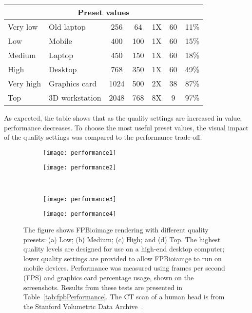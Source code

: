 \begin{table}
\begin{tabular}{|l l|c c c|c c|}
\multicolumn{7}{|c|}{\textbf{Preset values}} \\ \hline
Very low & Old laptop & 256 & 64 & 1X & 60 & 11\% \\
Low & Mobile & 400 & 100 & 1X & 60 & 15\% \\
Medium & Laptop & 450 & 150 & 1X & 60 & 18\% \\
High & Desktop & 768 & 350 & 1X & 60 & 49\% \\
Very high & Graphics card & 1024 & 500 & 2X & 38 & 87\% \\
Top & 3D workstation & 2048 & 768 & 8X & 9 & 97\% \\
\hline

\end{tabular}
\end{table}

As expected, the table shows that as the quality settings are increased in value, performance decreases. 
To choose the most useful preset values, the visual impact of the quality settings was compared to the performance trade-off. 

\begin{figure}[htbp!]
\centering
\begin{subfigure}[b]{0.49\textwidth}
\texttt{[image: performance1]}
\caption{} \label{fig:performance1}
\end{subfigure}
\hfill
\begin{subfigure}[b]{0.49\textwidth}
\texttt{[image: performance2]}
\caption{} \label{fig:performance2}
\end{subfigure}

~\newline
\begin{subfigure}[b]{0.49\textwidth}
\texttt{[image: performance3]}
\caption{} \label{fig:performance3}
\end{subfigure}
\hfill
\begin{subfigure}[b]{0.49\textwidth}
\texttt{[image: performance4]}
\caption{} \label{fig:performance4}
\end{subfigure}
\caption[FPBioimage: Adjustable quality settings allow FPBioimage to be used on a range of devices]{The figure shows FPBioimage rendering with different quality presets: (a) Low; (b) Medium; (c) High; and (d) Top. The highest quality levels are designed for use on a high-end desktop computer; lower quality settings are provided to allow FPBioiamge to run on mobile devices. Performance was measured using frames per second (FPS) and graphics card percentage usage, shown on the screenshots. Results from these tests are presented in Table~\ref{tab:fpbPerformance}. The CT scan of a human head is from the Stanford Volumetric Data Archive~\cite{levoy1988volume}. }
\label{fig:fpb-quality}
\end{figure}

